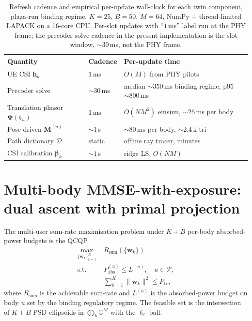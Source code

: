 \documentclass[journal,twocolumn,10pt]{IEEEtran}
\theoremstyle{plain}
\theoremstyle{remark}
\newcommand{\hh}{\mathbf{h}}
\newcommand{\ww}{\mathbf{w}}
\newcommand{\Pabs}{P_{\mathrm{abs}}}
\newcommand{\Mmat}{\mathbf{M}}
\newcommand{\Phimat}{\mathbf{\Phi}}
\newcommand{\Complex}{\mathbb{C}}
\newcommand{\AllBodies}{\mathcal{P}}
\newcommand{\Dict}{\mathcal{D}}
\begin{document}
\begin{table}[!t]
\caption{Refresh cadence and empirical per-update wall-clock for
each twin component, plaza-run binding regime, $K = 25$, $B = 50$,
$M = 64$, NumPy + thread-limited LAPACK on a 16-core CPU.
Per-slot updates with ``$1\,$ms'' label run at the PHY frame; the
precoder solve cadence in the present implementation is the slot
window, $\sim 30\,$ms, not the PHY frame.}
\label{tab:cadence}
\centering
\small
\begin{tabular}{@{}p{}p{}p{}@{}}
\toprule
Quantity & Cadence & Per-update time \\
\midrule
UE CSI $\hh_k$ & $1\,$ms & $O(M)$ from PHY pilots \\
Precoder solve & $\sim 30\,$ms & median $\sim 350\,$ms binding regime, p95 $\sim 800\,$ms \\
Translation phasor $\Phimat(\mathbf{t}_u)$ & $1\,$ms & $O(N M^2)$ einsum, $\sim 25\,$ms per body \\
Pose-driven $\Mmat^{(u)}$ & $\sim 1\,$s & $\sim 80\,$ms per body, $\sim 2.4$\,k tri \\
Path dictionary $\Dict$ & static & offline ray tracer, minutes \\
CSI calibration $\bm\beta_k$ & $\sim 1\,$s & ridge LS, $O(N M)$ \\
\bottomrule
\end{tabular}
\end{table}


\section{Multi-body MMSE-with-exposure: dual ascent
with primal projection}\label{sec:precoder}

The multi-user sum-rate maximisation problem under $K + B$ per-body
absorbed-power budgets is the QCQP
\begin{equation}\label{eq:P-MB}
\begin{aligned}
  \max_{\{\ww_k\}_{k=1}^K} \;& R_{\mathrm{sum}}(\{\ww_k\}) \\
  \text{s.t.}\;& \Pabs^{(u)} \leq L^{(u)},\quad u \in \AllBodies,\\
  & \sum_{k=1}^K \|\ww_k\|^2 \leq P_{\mathrm{tx}},
\end{aligned}
\end{equation}
where $R_{\mathrm{sum}}$ is the achievable sum-rate and $L^{(u)}$
is the absorbed-power budget on body $u$ set by the binding
regulatory regime. The feasible set is the intersection of
$K + B$ PSD ellipsoids in $\bigoplus_k \Complex^M$ with the
$\ell_2$ ball.
\end{document}
